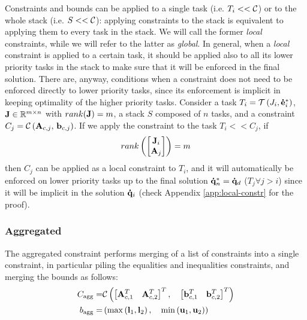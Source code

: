 Constraints and bounds can be applied to a single task (i.e. $T_i << \mathcal{C}$) or to the whole stack (i.e. $S << \mathcal{C}$): applying constraints to the stack is equivalent to applying them to every task in the stack.
We will call the former \emph{local} constraints, while we will refer to the latter as \emph{global}. In general, when a \emph{local} constraint is applied to a certain task, it should be applied also to all its lower priority tasks in the stack to make sure that it will be enforced in the final solution. There are, anyway, conditions when a constraint does not need to be enforced directly to lower priority tasks, since its enforcement is implicit in keeping optimality of the higher priority tasks.
Consider a task $T_i=\mathcal{T}\left(J_i,\mathbf{\dot{e}}^*_i\right)$, $\mathbf{J} \in \mathbb{R}^{m\times n}$ with $rank(\mathbf{J}) = m$, a stack $S$ composed of $n$ tasks, and a constraint $C_j=\mathcal{C}\left(\mathbf{A}_{c,j},\,\mathbf{b}_{c,j}\right)$. If we apply the constraint to the task $T_i << C_j$, if 
\begin{equation}
rank\left ( \begin{bmatrix}
\mathbf{J}_i\\ 
\mathbf{A}_j
\end{bmatrix} \right ) = m
\end{equation}
then $C_j$ can be applied as a local constraint to $T_i$, and it will automatically be enforced on lower priority tasks up to the final solution $\mathbf{\dot{q}}_n^*=\mathbf{\dot{q}}_d$ ($T_j \forall j>i$) since it will be implicit in the solution $\mathbf{\dot{q}}_i$ (check Appendix \ref{app:local-constr} for the proof).

\subsubsection{Aggregated}
The aggregated constraint performs merging of a list of constraints into a single constraint, in particular piling the equalities and inequalities constraints, and merging the bounds as follows:
\begin{eqnarray}
C_{\text{agg}} = & \mathcal{C}\left( \left[ \mathbf{A}_{c,1}^T \quad \mathbf{A}_{c,2}^T \right]^T,\quad \left[ \mathbf{b}_{c,1}^T \quad \mathbf{b}_{c,2}^T \right]^T \right) \\
b_{\text{agg}} = & \left( \max\left(\textbf{l}_1,\textbf{l}_2 \right), \quad \min\left(\textbf{u}_1,\textbf{u}_2\right) \right)
\end{eqnarray}


